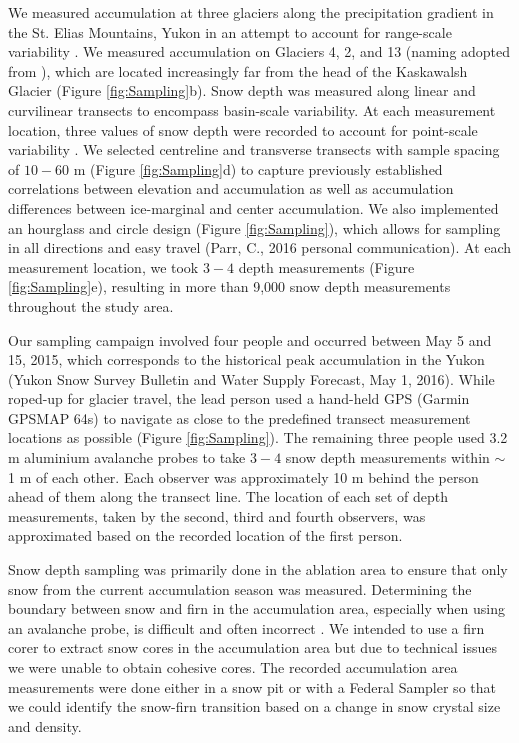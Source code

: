 \documentclass[twocolumn,letterpaper]{igs}
\begin{document}
We measured accumulation at three glaciers along the precipitation gradient in the St. Elias Mountains, Yukon \citep{Taylor1969} in an attempt to account for range-scale variability \citep{Clark2011}. We measured accumulation on Glaciers 4, 2, and 13 (naming adopted from \cite{Crompton2016}), which are located increasingly far from the head of the Kaskawalsh Glacier (Figure \ref{fig:Sampling}b). Snow depth was measured along linear and curvilinear transects to encompass basin-scale variability. At each measurement location, three values of snow depth were recorded to account for point-scale variability \citep{Clark2011}.  We selected centreline and transverse transects with sample spacing of $10-60$ m (Figure \ref{fig:Sampling}d) to capture previously established correlations between elevation and accumulation \citep{Machguth2006, Walmsley2015} as well as accumulation differences between ice-marginal and center accumulation. We also implemented an hourglass and circle design (Figure \ref{fig:Sampling}), which allows for sampling in all directions and easy travel (Parr, C., 2016 personal communication). At each measurement location, we took $3-4$ depth measurements (Figure \ref{fig:Sampling}e), resulting in more than 9,000 snow depth measurements throughout the study area. 

Our sampling campaign involved four people and occurred between May 5 and 15, 2015, which corresponds to the historical peak accumulation in the Yukon (Yukon Snow Survey Bulletin and Water Supply Forecast, May 1, 2016). While roped-up for glacier travel, the lead person used a hand-held GPS (Garmin GPSMAP 64s) to navigate as close to the predefined transect measurement locations as possible (Figure \ref{fig:Sampling}). The remaining three people used 3.2 m aluminium avalanche probes to take $3-4$ snow depth measurements within $\sim$1 m of each other. Each observer was approximately 10 m behind the person ahead of them along the transect line. The location of each set of depth measurements, taken by the second, third and fourth observers, was approximated based on the recorded location of the first person. 

Snow depth sampling was primarily done in the ablation area to ensure that only snow from the current accumulation season was measured. Determining the boundary between snow and firn in the accumulation area, especially when using an avalanche probe, is difficult and often incorrect \citep{Grunewald2010,Sold2013}. We intended to use a firn corer to extract snow cores in the accumulation area but due to technical issues we were unable to obtain cohesive cores. The recorded accumulation area measurements were done either in a snow pit or with a Federal Sampler so that we could identify the snow-firn transition based on a change in snow crystal size and density. 
\end{document}
